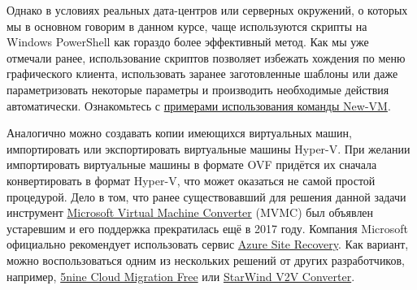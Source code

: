 \documentclass[14pt, a4paper]{article}
\begin{document}
\begin{figure}[h]%
    \label{1.6} %
\end{figure}

Однако в условиях реальных дата-центров или серверных окружений, о которых мы в основном
говорим в данном курсе, чаще используются скрипты на Windows PowerShell как гораздо более
эффективный метод. Как мы уже отмечали ранее, использование скриптов позволяет избежать
хождения по меню графического клиента, использовать заранее заготовленные шаблоны или даже
параметризовать некоторые параметры и производить необходимые действия автоматически.
Ознакомьтесь с \href{https://docs.microsoft.com/en-us/powershell/module/hyper-v/new-vm}{примерами использования команды New-VM}.

Аналогично можно создавать копии имеющихся виртуальных машин, импортировать или
экспортировать виртуальные машины Hyper-V. При желании импортировать виртуальные машины в
формате OVF придётся их сначала конвертировать в формат Hyper-V, что может оказаться не самой
простой процедурой. Дело в том, что ранее существовавший для решения данной задачи инструмент
\href{https://docs.microsoft.com/en-us/previous-versions/windows/it-pro/windows-server-2012-r2-and-2012/dn874008(v%3Dws.11)}{Microsoft Virtual Machine Converter} (MVMC) был объявлен устаревшим и его поддержка прекратилась
ещё в 2017 году. Компания Microsoft официально рекомендует использовать сервис \href{https://azure.microsoft.com/en-us/services/site-recovery/}{Azure Site
Recovery}. Как вариант, можно воспользоваться одним из нескольких решений от других
разработчиков, например, \href{https://www.5nine.com/5nine-cloud-migration-free/}{5nine Cloud Migration Free} или \href{https://www.starwindsoftware.com/starwind-v2v-converter}{StarWind V2V Converter}.\\
\end{document}
